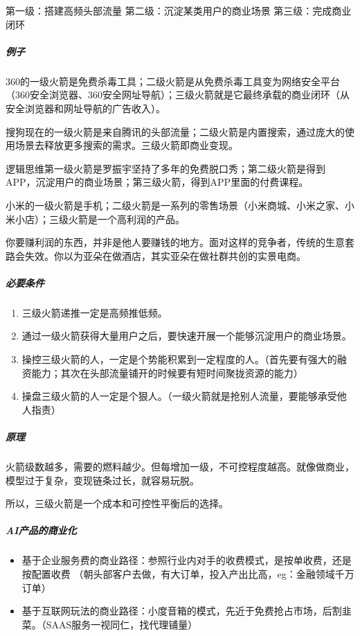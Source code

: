 \documentclass[letterpaper,10pt,english]{sphinxmanual}
\begin{document}
第一级：搭建高频头部流量 第二级：沉淀某类用户的商业场景
第三级：完成商业闭环


\subparagraph{例子}
\label{\detokenize{chapter_idea/business:id25}}
360的一级火箭是免费杀毒工具；二级火箭是从免费杀毒工具变为网络安全平台（360安全浏览器、360安全网址导航）；三级火箭就是它最终承载的商业闭环（从安全浏览器和网址导航的广告收入）。

搜狗现在的一级火箭是来自腾讯的头部流量；二级火箭是内置搜索，通过庞大的使用场景去释放更多搜索的需求。三级火箭即商业变现。

逻辑思维第一级火箭是罗振宇坚持了多年的免费脱口秀；第二级火箭是得到APP，沉淀用户的商业场景；第三级火箭，得到APP里面的付费课程。

小米的一级火箭是手机；二级火箭是一系列的零售场景（小米商城、小米之家、小米小店）；三级火箭是一个高利润的产品。

你要赚利润的东西，并非是他人要赚钱的地方。面对这样的竞争者，传统的生意套路会失效。你以为亚朵在做酒店，其实亚朵在做社群共创的实景电商。


\subparagraph{必要条件}
\label{\detokenize{chapter_idea/business:id26}}\begin{enumerate}
%
\item {} 
三级火箭递推一定是高频推低频。

\item {} 
通过一级火箭获得大量用户之后，要快速开展一个能够沉淀用户的商业场景。

\item {} 
操控三级火箭的人，一定是个势能积累到一定程度的人。（首先要有强大的融资能力；其次在头部流量铺开的时候要有短时间聚拢资源的能力）

\item {} 
操盘三级火箭的人一定是个狠人。（一级火箭就是抢别人流量，要能够承受他人指责）

\end{enumerate}


\subparagraph{原理}
\label{\detokenize{chapter_idea/business:id27}}
火箭级数越多，需要的燃料越少。但每增加一级，不可控程度越高。就像做商业，模型过于复杂，变现链条过长，就容易玩脱。

所以，三级火箭是一个成本和可控性平衡后的选择。


\subparagraph{AI产品的商业化}
\label{\detokenize{chapter_idea/business:ai}}\begin{itemize}
\item {} 
基于企业服务费的商业路径：参照行业内对手的收费模式，是按单收费，还是按配置收费
（朝头部客户去做，有大订单，投入产出比高，eg：金融领域千万订单）

\item {} 
基于互联网玩法的商业路径：小度音箱的模式，先近于免费抢占市场，后割韭菜。（SAAS服务一视同仁，找代理铺量）

\end{itemize}
\end{document}

